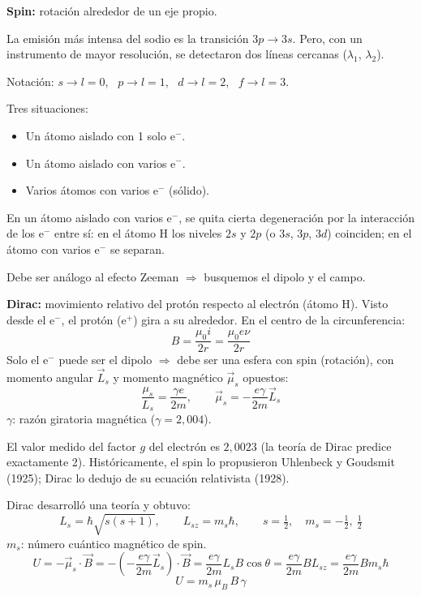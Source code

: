 \documentclass[11pt,a4paper]{article}
\begin{document}
\textbf{Spin:} rotación alrededor de un eje propio.

La emisión más intensa del sodio es la transición $3p\to3s$. Pero, con un instrumento de mayor resolución, se detectaron
dos líneas cercanas ($\lambda_1$, $\lambda_2$).

Notación: $s\to l=0$, \ $p\to l=1$, \ $d\to l=2$, \ $f\to l=3$.

Tres situaciones:
\begin{itemize}
  \item Un átomo aislado con 1 solo e$^-$.
  \item Un átomo aislado con varios e$^-$.
  \item Varios átomos con varios e$^-$ (sólido).
\end{itemize}
En un átomo aislado con varios e$^-$, se quita cierta degeneración por la interacción de los e$^-$ entre sí: en el átomo H
los niveles $2s$ y $2p$ (o $3s$, $3p$, $3d$) coinciden; en el átomo con varios e$^-$ se separan.

Debe ser análogo al efecto Zeeman $\Rightarrow$ busquemos el dipolo y el campo.

\textbf{Dirac:} movimiento relativo del protón respecto al electrón (átomo H). Visto desde el e$^-$, el protón (e$^+$) gira a su
alrededor. En el centro de la circunferencia:
\[
B=\frac{\mu_0i}{2r}=\frac{\mu_0e\nu}{2r}
\]
Solo el e$^-$ puede ser el dipolo $\Rightarrow$ debe ser una esfera con spin (rotación), con momento angular $\vec L_s$ y momento
magnético $\vec\mu_s$ opuestos:
\[
\frac{\mu_s}{L_s}=\frac{\gamma e}{2m},\qquad \vec\mu_s=-\frac{e\gamma}{2m}\vec L_s
\]
$\gamma$: razón giratoria magnética ($\gamma=2{,}004$).

\begin{obs}
El valor medido del factor $g$ del electrón es $2{,}0023$ (la teoría de Dirac predice exactamente 2). Históricamente, el spin
lo propusieron Uhlenbeck y Goudsmit (1925); Dirac lo dedujo de su ecuación relativista (1928).
\end{obs}

Dirac desarrolló una teoría y obtuvo:
\[
L_s=\hbar\sqrt{s(s+1)},\qquad L_{sz}=m_s\hbar,\qquad s=\tfrac12,\quad m_s=-\tfrac12,\ \tfrac12
\]
$m_s$: número cuántico magnético de spin.
\[
U=-\vec\mu_s\cdot\vec B=-\left(-\frac{e\gamma}{2m}\vec L_s\right)\cdot\vec B=\frac{e\gamma}{2m}L_sB\cos\theta=\frac{e\gamma}{2m}BL_{sz}=\frac{e\gamma}{2m}Bm_s\hbar
\]
\[
\boxed{U=m_s\,\mu_B\,B\,\gamma}
\]
\end{document}
